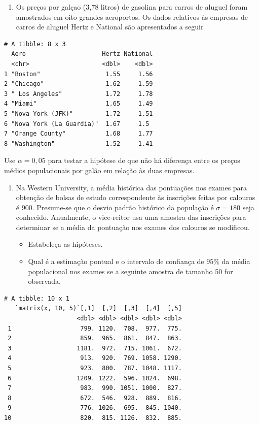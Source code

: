 \documentclass[
  10pt,
  a4paper]{book}
\providecommand{\tightlist}{%
  \setlength{\itemsep}{0pt}\setlength{\parskip}{0pt}}
\begin{document}
\begin{enumerate}
\def\labelenumi{\arabic{enumi}.}
\setcounter{enumi}{1}
\tightlist
\item
  Os preços por galçao (3,78 litros) de gasolina para carros de aluguel foram amostrados em oito grandes aeroportos. Os dados relativos às empresas de carros de aluguel Hertz e National são apresentados a seguir
\end{enumerate}

\begin{verbatim}
# A tibble: 8 x 3
  Aero                     Hertz National
  <chr>                    <dbl>    <dbl>
1 "Boston"                  1.55     1.56
2 "Chicago"                 1.62     1.59
3 " Los Angeles"            1.72     1.78
4 "Miami"                   1.65     1.49
5 "Nova York (JFK)"         1.72     1.51
6 "Nova York (La Guardia)"  1.67     1.5 
7 "Orange County"           1.68     1.77
8 "Washington"              1.52     1.41
\end{verbatim}

Use \(\alpha = 0,05\) para testar a hipótese de que não há diferença entre os preços médios populacionais por galão em relação às duas empresas.

\begin{enumerate}
\def\labelenumi{\arabic{enumi}.}
\setcounter{enumi}{2}
\tightlist
\item
  Na Western University, a média histórica das pontuações nos exames para obtenção de bolsas de estudo correspondente às inscrições feitas por calouros é 900. Presume-se que o desvio padrão histórico da população é \(\sigma = 180\) seja conhecido. Anualmente, o vice-reitor usa uma amostra das inscrições para determinar se a média da pontuação nos exames dos calouros se modificou.

  \begin{itemize}
  \tightlist
  \item
    Estabeleça as hipóteses.
  \item
    Qual é a estimação pontual e o intervalo de confiança de \(95\%\) da média populacional nos exames se a seguinte amostra de tamanho 50 for observada.
  \end{itemize}
\end{enumerate}

\begin{verbatim}
# A tibble: 10 x 1
   `matrix(x, 10, 5)`[,1]  [,2]  [,3]  [,4]  [,5]
                    <dbl> <dbl> <dbl> <dbl> <dbl>
 1                   799. 1120.  708.  977.  775.
 2                   859.  965.  861.  847.  863.
 3                  1181.  972.  715. 1061.  672.
 4                   913.  920.  769. 1058. 1290.
 5                   923.  800.  787. 1048. 1117.
 6                  1209. 1222.  596. 1024.  698.
 7                   983.  990. 1051. 1000.  827.
 8                   672.  546.  928.  889.  816.
 9                   776. 1026.  695.  845. 1040.
10                   820.  815. 1126.  832.  885.
\end{verbatim}
\end{document}
